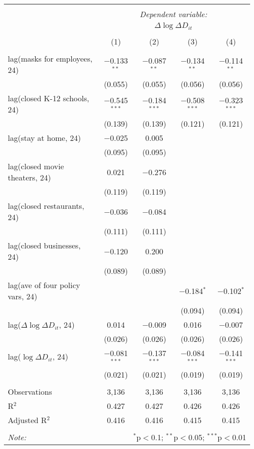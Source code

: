 \begin{tabular}{@{\extracolsep{1pt}}lcccc} 
\\[-1.8ex]\hline 
\hline \\[-1.8ex] 
 & \multicolumn{4}{c}{\textit{Dependent variable:}} \\ 
\cline{2-5} 
 & \multicolumn{4}{c}{$\Delta \log \Delta D_{it}$} \\ 
\\[-1.8ex] & (1) & (2) & (3) & (4)\\ 
\hline \\[-1.8ex] 
 lag(masks for employees, 24) & $-$0.133$^{**}$ & $-$0.087$^{**}$ & $-$0.134$^{**}$ & $-$0.114$^{**}$ \\ 
  & (0.055) & (0.055) & (0.056) & (0.056) \\ 
  lag(closed K-12 schools, 24) & $-$0.545$^{***}$ & $-$0.184$^{***}$ & $-$0.508$^{***}$ & $-$0.323$^{***}$ \\ 
  & (0.139) & (0.139) & (0.121) & (0.121) \\ 
  lag(stay at home, 24) & $-$0.025 & 0.005 &  &  \\ 
  & (0.095) & (0.095) &  &  \\ 
  lag(closed movie theaters, 24) & 0.021 & $-$0.276 &  &  \\ 
  & (0.119) & (0.119) &  &  \\ 
  lag(closed restaurants, 24) & $-$0.036 & $-$0.084 &  &  \\ 
  & (0.111) & (0.111) &  &  \\ 
  lag(closed businesses, 24) & $-$0.120 & 0.200 &  &  \\ 
  & (0.089) & (0.089) &  &  \\ 
  lag(ave of four policy vars, 24) &  &  & $-$0.184$^{*}$ & $-$0.102$^{*}$ \\ 
  &  &  & (0.094) & (0.094) \\ 
  lag($\Delta \log \Delta D_{it}$, 24) & 0.014 & $-$0.009 & 0.016 & $-$0.007 \\ 
  & (0.026) & (0.026) & (0.026) & (0.026) \\ 
  lag($\log \Delta D_{it}$, 24) & $-$0.081$^{***}$ & $-$0.137$^{***}$ & $-$0.084$^{***}$ & $-$0.141$^{***}$ \\ 
  & (0.021) & (0.021) & (0.019) & (0.019) \\ 
 \hline \\[-1.8ex] 
Observations & 3,136 & 3,136 & 3,136 & 3,136 \\ 
R$^{2}$ & 0.427 & 0.427 & 0.426 & 0.426 \\ 
Adjusted R$^{2}$ & 0.416 & 0.416 & 0.415 & 0.415 \\ 
\hline 
\hline \\[-1.8ex] 
\textit{Note:}  & \multicolumn{4}{r}{$^{*}$p$<$0.1; $^{**}$p$<$0.05; $^{***}$p$<$0.01} \\ 
\end{tabular} 